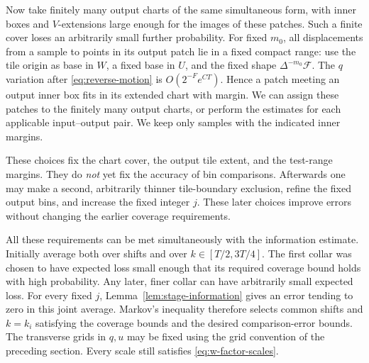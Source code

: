 Now take finitely many output charts of the same simultaneous
form, with inner boxes and \(V\)-extensions large enough for the
images of these patches.  Such a finite cover loses an arbitrarily
small further probability.  For fixed \(m_0\), all displacements
from a sample to points in its output patch lie in a fixed compact
range: use the tile origin as base in \(W\), a fixed base in \(U\),
and the fixed shape \(\Delta^{-m_0}\mathcal F\).
The \(q\) variation after \eqref{eq:reverse-motion} is
\(O(2^{-F}e^{CT})\).
Hence a patch meeting an output inner box fits in its extended
chart with margin.  We can assign these patches to the finitely
many output charts, or perform the estimates for each applicable
input--output pair.  We keep only samples with the indicated
inner margins.

These choices fix the chart cover, the output tile extent, and
the test-range margins.  They do \emph{not} yet fix the accuracy
of bin comparisons.  Afterwards one may make a second,
arbitrarily thinner tile-boundary exclusion, refine the fixed
output bins, and increase the fixed integer \(j\).  These later
choices improve errors without changing the earlier coverage
requirements.

All these requirements can be met simultaneously with the
information estimate.  Initially average both over shifts and
over \(k\in[T/2,3T/4]\).  The first collar was chosen to have
expected loss small enough that its required coverage bound
holds with high probability.  Any later, finer collar can have
arbitrarily small expected loss.  For every fixed \(j\),
Lemma~\ref{lem:stage-information} gives an error tending to zero
in this joint average.  Markov's inequality therefore selects
common shifts and \(k=k_i\) satisfying the coverage bounds and
the desired comparison-error bounds.  The transverse grids in
\(q,u\) may be fixed using the grid convention of the preceding
section.  Every scale still satisfies
\eqref{eq:w-factor-scales}.

